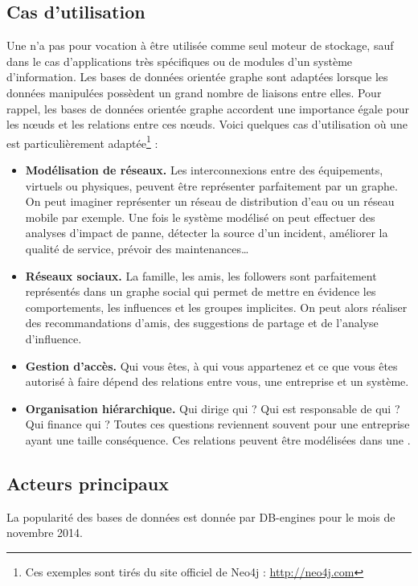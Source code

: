 \subsection{Cas d'utilisation}
	Une \bddGraphe{} n'a pas pour vocation à être utilisée comme seul moteur de stockage, sauf dans le cas d'applications très spécifiques ou de modules d'un système d'information. Les bases de données orientée graphe sont adaptées lorsque les données manipulées possèdent un grand nombre de liaisons entre elles. Pour rappel, les bases de données orientée graphe accordent une importance égale pour les nœuds et les relations entre ces nœuds. Voici quelques cas d'utilisation où une \bddGraphe{} est particulièrement adaptée\footnote{Ces exemples sont tirés du site officiel de Neo4j : \url{http://neo4j.com}} :
	\vspace{10px}
	\begin{itemize}
	 	\item \textbf{Modélisation de réseaux.} Les interconnexions entre des équipements, virtuels ou physiques, peuvent être représenter parfaitement par un graphe. On peut imaginer représenter un réseau de distribution d'eau ou un réseau mobile par exemple. Une fois le système modélisé on peut effectuer des analyses d'impact de panne, détecter la source d'un incident, améliorer la qualité de service, prévoir des maintenances\dots
	 	\item \textbf{Réseaux sociaux.} La famille, les amis, les followers sont parfaitement représentés dans un graphe social qui permet de mettre en évidence les comportements, les influences et les groupes implicites. On peut alors réaliser des recommandations d'amis, des suggestions de partage et de l'analyse d'influence.
	 	\item \textbf{Gestion d'accès.} Qui vous êtes, à qui vous appartenez et ce que vous êtes autorisé à faire dépend des relations entre vous, une entreprise et un système.
	 	\item \textbf{Organisation hiérarchique.} Qui dirige qui ? Qui est responsable de qui ? Qui finance qui ? Toutes ces questions reviennent souvent pour une entreprise ayant une taille conséquence. Ces relations peuvent être modélisées dans une \bddGraphe{}.
	 \end{itemize} 

\subsection{Acteurs principaux}
	La popularité des bases de données est donnée par DB-engines\cite{db_engines_key_value} pour le mois de novembre 2014.

